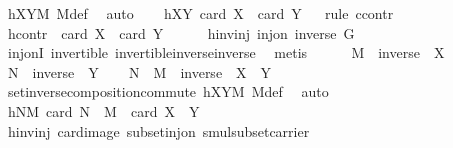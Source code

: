 \begin{isabellebody}
\ hXYM\ M{\isacharunderscore}{\kern0pt}def\ \isamarkupfalse%
\ auto\isanewline
\ \ \isamarkupfalse%
\ hXY{\isacharcolon}{\kern0pt}\ {\isachardoublequoteopen}card\ X\ {\isasymle}\ card\ Y{\isachardoublequoteclose}\isanewline
\ \ \isamarkupfalse%
{\isacharparenleft}{\kern0pt}rule\ ccontr{\isacharparenright}{\kern0pt}\isanewline
\ \ \ \ \isamarkupfalse%
\ hcontr{\isacharcolon}{\kern0pt}\ {\isachardoublequoteopen}{\isasymnot}\ card\ X\ {\isasymle}\ card\ Y{\isachardoublequoteclose}\isanewline
\ \ \ \ \isamarkupfalse%
\ hinvinj{\isacharcolon}{\kern0pt}\ {\isachardoublequoteopen}inj{\isacharunderscore}{\kern0pt}on\ inverse\ G{\isachardoublequoteclose}\ \isamarkupfalse%
\ inj{\isacharunderscore}{\kern0pt}onI\ invertible\ invertible{\isacharunderscore}{\kern0pt}inverse{\isacharunderscore}{\kern0pt}inverse\ \isamarkupfalse%
\ metis\isanewline
\ \ \ \ \isamarkupfalse%
\ {\isacharquery}{\kern0pt}M\ {\isacharequal}{\kern0pt}\ {\isachardoublequoteopen}inverse\ {\isacharbackquote}{\kern0pt}\ X{\isachardoublequoteclose}\isanewline
\ \ \ \ \isamarkupfalse%
\ {\isacharquery}{\kern0pt}N\ {\isacharequal}{\kern0pt}\ {\isachardoublequoteopen}inverse\ {\isacharbackquote}{\kern0pt}\ Y{\isachardoublequoteclose}\isanewline
\ \ \isamarkupfalse%
\ {\isachardoublequoteopen}{\isacharquery}{\kern0pt}N\ {\isasymcdots}\ {\isacharquery}{\kern0pt}M\ {\isacharequal}{\kern0pt}\ inverse\ {\isacharbackquote}{\kern0pt}\ {\isacharparenleft}{\kern0pt}X\ {\isasymcdots}\ Y{\isacharparenright}{\kern0pt}{\isachardoublequoteclose}\ \isamarkupfalse%
\ set{\isacharunderscore}{\kern0pt}inverse{\isacharunderscore}{\kern0pt}composition{\isacharunderscore}{\kern0pt}commute\ hXYM\ M{\isacharunderscore}{\kern0pt}def\ \isamarkupfalse%
\ auto\isanewline
\ \ \isamarkupfalse%
\ \isamarkupfalse%
\ hNM{\isacharcolon}{\kern0pt}\ {\isachardoublequoteopen}card\ {\isacharparenleft}{\kern0pt}{\isacharquery}{\kern0pt}N\ {\isasymcdots}\ {\isacharquery}{\kern0pt}M{\isacharparenright}{\kern0pt}\ {\isacharequal}{\kern0pt}\ card\ {\isacharparenleft}{\kern0pt}X\ {\isasymcdots}\ Y{\isacharparenright}{\kern0pt}{\isachardoublequoteclose}\ \isanewline
\ \ \ \ \isamarkupfalse%
\ hinvinj\ card{\isacharunderscore}{\kern0pt}image\ subset{\isacharunderscore}{\kern0pt}inj{\isacharunderscore}{\kern0pt}on\ smul{\isacharunderscore}{\kern0pt}subset{\isacharunderscore}{\kern0pt}carrier\ \isamarkupfalse%

\end{isabellebody}
